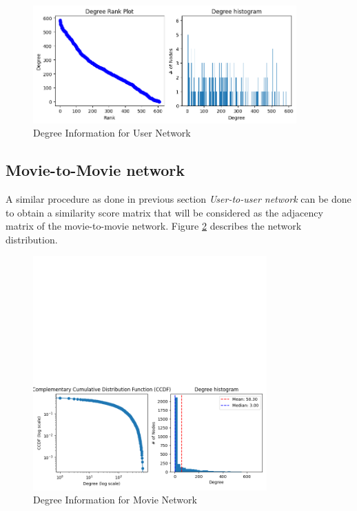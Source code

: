 \documentclass[12pt]{article}
\numberwithin{equation}{section}
\begin{document}
\begin{figure}[h!]
    \begin{minipage}[b]{01\linewidth}
         \centering
  	\includegraphics[width=0.9\textwidth]{UN_degreeinfo.png}
  	\caption{Degree Information for User Network}
  	\label{fig:UN_degreeinfo}
    \end{minipage}
\end{figure}

\subsection{Movie-to-Movie network}

A similar procedure as done in previous section \textit{User-to-user network} can be done to obtain a similarity score matrix that will be considered as the adjacency matrix of the movie-to-movie network. Figure \ref{fig:MN_degreeinfo} describes the network distribution. 

\begin{figure}[h!]
    \centering
  	\includegraphics[width=0.8\textwidth]{movie2movie_analysis.png}
  	\caption{Degree Information for Movie Network}
  	\label{fig:MN_degreeinfo}
\end{figure}
\end{document}
